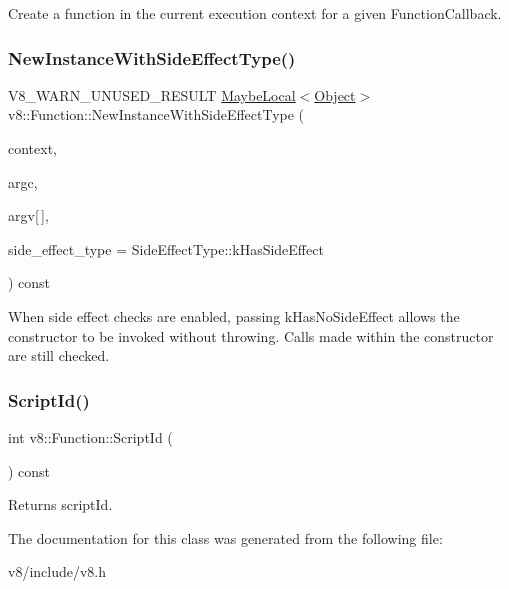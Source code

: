 Create a function in the current execution context for a given Function\+Callback. \mbox{\label{classv8_1_1Function_a3563e1a0f7de54f2d493a93a4e5e3b69}} 
\subsubsection{\texorpdfstring{New\+Instance\+With\+Side\+Effect\+Type()}{NewInstanceWithSideEffectType()}}
{\footnotesize\ttfamily V8\+\_\+\+W\+A\+R\+N\+\_\+\+U\+N\+U\+S\+E\+D\+\_\+\+R\+E\+S\+U\+LT \mbox{\hyperlink{classv8_1_1MaybeLocal}{Maybe\+Local}}$<$\mbox{\hyperlink{classv8_1_1Object}{Object}}$>$ v8\+::\+Function\+::\+New\+Instance\+With\+Side\+Effect\+Type (\begin{DoxyParamCaption}\item[{\mbox{\hyperlink{classv8_1_1Local}{Local}}$<$ \mbox{\hyperlink{classv8_1_1Context}{Context}} $>$}]{context,  }\item[{int}]{argc,  }\item[{\mbox{\hyperlink{classv8_1_1Local}{Local}}$<$ \mbox{\hyperlink{classv8_1_1Value}{Value}} $>$}]{argv\mbox{[}$\,$\mbox{]},  }\item[{\mbox{\hyperlink{namespacev8_a29711319c2b9fc7716d65faee2f7b9cb}{Side\+Effect\+Type}}}]{side\+\_\+effect\+\_\+type = {\ttfamily SideEffectType\+:\+:kHasSideEffect} }\end{DoxyParamCaption}) const}

When side effect checks are enabled, passing k\+Has\+No\+Side\+Effect allows the constructor to be invoked without throwing. Calls made within the constructor are still checked. \mbox{\label{classv8_1_1Function_a5070c2657325ed6ca05ebb932c641438}} 
\subsubsection{\texorpdfstring{Script\+Id()}{ScriptId()}}
{\footnotesize\ttfamily int v8\+::\+Function\+::\+Script\+Id (\begin{DoxyParamCaption}{ }\end{DoxyParamCaption}) const}

Returns script\+Id. 

The documentation for this class was generated from the following file\+:\begin{DoxyCompactItemize}
\item 
v8/include/v8.\+h\end{DoxyCompactItemize}
